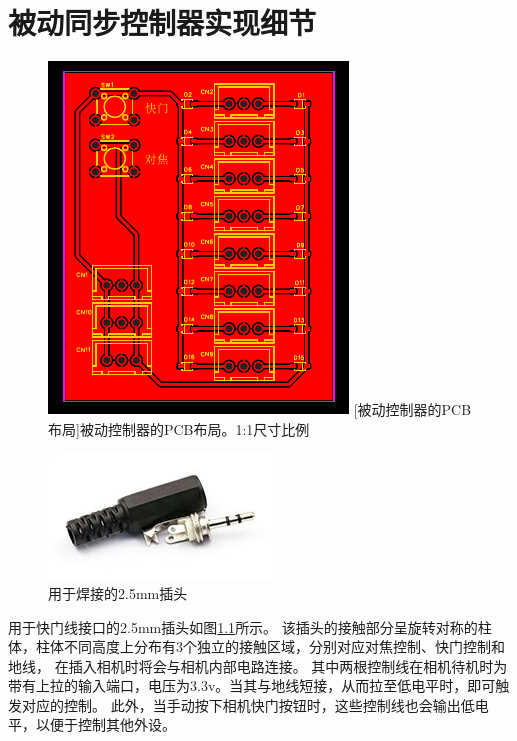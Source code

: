 \chapter{被动同步控制器实现细节}
\label{app:passive_sync}

\begin{figure}
    \begin{minipage}{0.52\textwidth}
        \centering
        \includegraphics{figures/passive_sync_pcb}
        [被动控制器的PCB布局]{被动控制器的PCB布局。1:1尺寸比例}
        \label{fig:passive_sync_pcb}
    \end{minipage}\hfill%
    \begin{minipage}{0.45\textwidth}
        \centering
        \includegraphics{figures/2.5mm}
        \caption{用于焊接的2.5mm插头}
        \label{fig:2.5mm}
    \end{minipage}
\end{figure}
用于快门线接口的2.5mm插头如图\ref{fig:2.5mm}所示。
该插头的接触部分呈旋转对称的柱体，柱体不同高度上分布有3个独立的接触区域，分别对应对焦控制、快门控制和地线，
在插入相机时将会与相机内部电路连接。
其中两根控制线在相机待机时为带有上拉的输入端口，电压为3.3v。当其与地线短接，从而拉至低电平时，即可触发对应的控制。
此外，当手动按下相机快门按钮时，这些控制线也会输出低电平，以便于控制其他外设。

